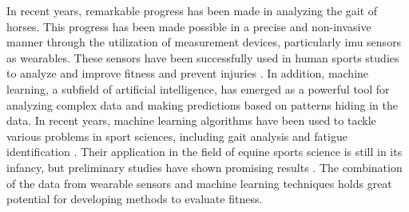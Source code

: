In recent years, remarkable progress has been made in analyzing the gait of horses. This progress has been made possible in a precise and non-invasive manner through the utilization of measurement devices, particularly \gls{imu} sensors as wearables. These sensors have been successfully used in human sports studies to analyze and improve fitness and prevent injuries \cite{fatiguereview}. In addition, machine learning, a subfield of artificial intelligence, has emerged as a powerful tool for analyzing complex data and making predictions based on patterns hiding in the data. In recent years, machine learning algorithms have been used to tackle various problems in sport sciences, including gait analysis \cite{prakash2018} and fatigue identification \cite{lirias2803493}. Their application in the field of equine sports science is still in its infancy, but preliminary studies have shown promising results \cite{egan2018}. The combination of the data from wearable sensors and machine learning techniques holds great potential for developing methods to evaluate fitness.